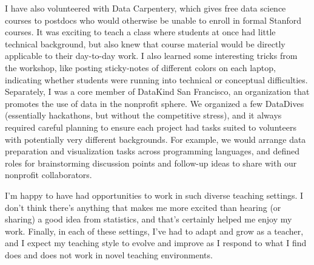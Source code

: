\documentclass{article}
\begin{document}
I have also volunteered with Data Carpentery, which gives free data science
courses to postdocs who would otherwise be unable to enroll in formal Stanford
courses. It was exciting to teach a class where students at once had little
technical background, but also knew that course material would be directly
applicable to their day-to-day work. I also learned some interesting tricks from
the workshop, like posting sticky-notes of different colors on each laptop,
indicating whether students were running into technical or conceptual
difficulties. Separately, I was a core member of DataKind San Francisco, an
organization that promotes the use of data in the nonprofit sphere. We organized
a few DataDives (essentially hackathons, but without the competitive stress),
and it always required careful planning to ensure each project had tasks suited
to volunteers with potentially very different backgrounds. For example, we would
arrange data preparation and visualization tasks across programming languages,
and defined roles for brainstorming discussion points and follow-up ideas to
share with our nonprofit collaborators.

I'm happy to have had opportunities to work in such diverse teaching settings. I
don't think there's anything that makes me more excited than hearing (or
sharing) a good idea from statistics, and that's certainly helped me enjoy my
work. Finally, in each of these settings, I've had to adapt and grow as a
teacher, and I expect my teaching style to evolve and improve as I respond to
what I find does and does not work in novel teaching environments.
\end{document}

